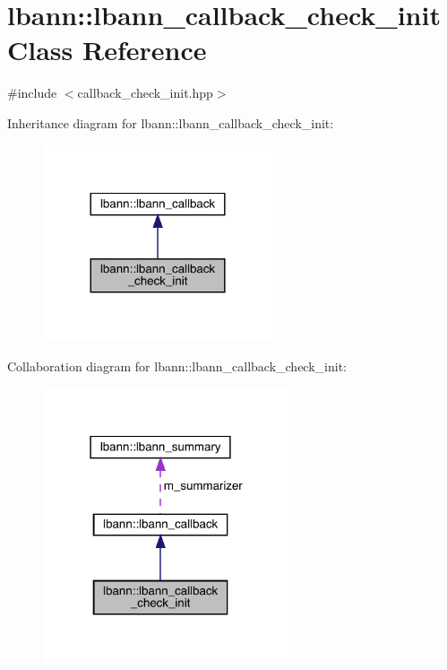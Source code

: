\hypertarget{classlbann_1_1lbann__callback__check__init}{}\section{lbann\+:\+:lbann\+\_\+callback\+\_\+check\+\_\+init Class Reference}
\label{classlbann_1_1lbann__callback__check__init}


{\ttfamily \#include $<$callback\+\_\+check\+\_\+init.\+hpp$>$}



Inheritance diagram for lbann\+:\+:lbann\+\_\+callback\+\_\+check\+\_\+init\+:\nopagebreak
\begin{figure}[H]
\begin{center}
\leavevmode
\includegraphics[width=192pt]{classlbann_1_1lbann__callback__check__init__inherit__graph}
\end{center}
\end{figure}


Collaboration diagram for lbann\+:\+:lbann\+\_\+callback\+\_\+check\+\_\+init\+:\nopagebreak
\begin{figure}[H]
\begin{center}
\leavevmode
\includegraphics[width=207pt]{classlbann_1_1lbann__callback__check__init__coll__graph}
\end{center}
\end{figure}
